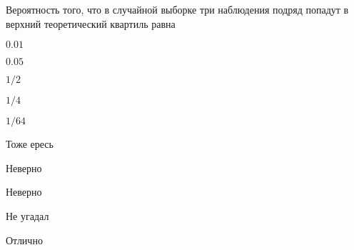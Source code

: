 
\begin{question}
Вероятность того, что в случайной выборке три наблюдения подряд попадут
в верхний теоретический квартиль равна
\begin{answerlist}
  \item \(0.01\)
  \item \(0.05\)
  \item \(1/2\)
  \item \(1/4\)
  \item \(1/64\)
\end{answerlist}
\end{question}

\begin{solution}
\begin{answerlist}
  \item Тоже ересь
  \item Неверно
  \item Неверно
  \item Не угадал
  \item Отлично
\end{answerlist}
\end{solution}

